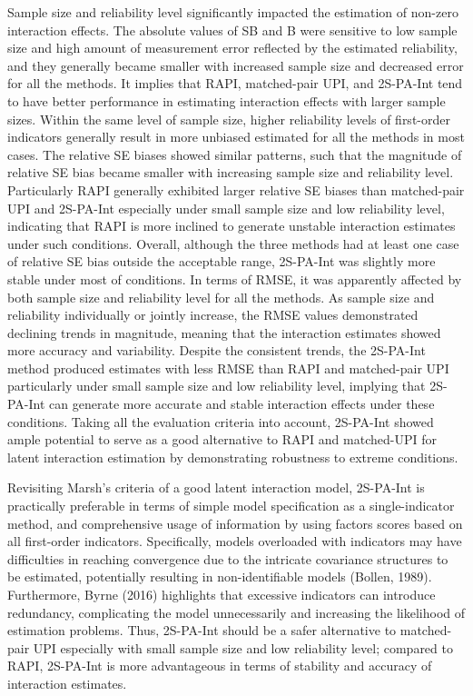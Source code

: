 \documentclass[
  man]{apa6}
\begin{document}
Sample size and reliability level significantly impacted the estimation of non-zero interaction effects. The absolute values of SB and B were sensitive to low sample size and high amount of measurement error reflected by the estimated reliability, and they generally became smaller with increased sample size and decreased error for all the methods. It implies that RAPI, matched-pair UPI, and 2S-PA-Int tend to have better performance in estimating interaction effects with larger sample sizes. Within the same level of sample size, higher reliability levels of first-order indicators generally result in more unbiased estimated for all the methods in most cases. The relative SE biases showed similar patterns, such that the magnitude of relative SE bias became smaller with increasing sample size and reliability level. Particularly RAPI generally exhibited larger relative SE biases than matched-pair UPI and 2S-PA-Int especially under small sample size and low reliability level, indicating that RAPI is more inclined to generate unstable interaction estimates under such conditions. Overall, although the three methods had at least one case of relative SE bias outside the acceptable range, 2S-PA-Int was slightly more stable under most of conditions. In terms of RMSE, it was apparently affected by both sample size and reliability level for all the methods. As sample size and reliability individually or jointly increase, the RMSE values demonstrated declining trends in magnitude, meaning that the interaction estimates showed more accuracy and variability. Despite the consistent trends, the 2S-PA-Int method produced estimates with less RMSE than RAPI and matched-pair UPI particularly under small sample size and low reliability level, implying that 2S-PA-Int can generate more accurate and stable interaction effects under these conditions. Taking all the evaluation criteria into account, 2S-PA-Int showed ample potential to serve as a good alternative to RAPI and matched-UPI for latent interaction estimation by demonstrating robustness to extreme conditions.

Revisiting Marsh's criteria of a good latent interaction model, 2S-PA-Int is practically preferable in terms of simple model specification as a single-indicator method, and comprehensive usage of information by using factors scores based on all first-order indicators. Specifically, models overloaded with indicators may have difficulties in reaching convergence due to the intricate covariance structures to be estimated, potentially resulting in non-identifiable models (Bollen, 1989). Furthermore, Byrne (2016) highlights that excessive indicators can introduce redundancy, complicating the model unnecessarily and increasing the likelihood of estimation problems. Thus, 2S-PA-Int should be a safer alternative to matched-pair UPI especially with small sample size and low reliability level; compared to RAPI, 2S-PA-Int is more advantageous in terms of stability and accuracy of interaction estimates.
\end{document}
